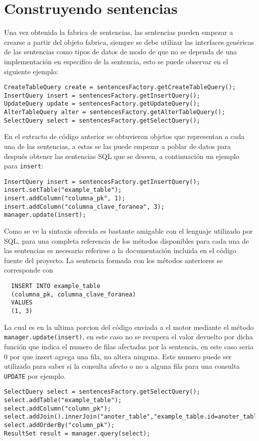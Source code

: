 \section{Construyendo sentencias}
%
%
Una vez obtenida la fabrica de sentencias, las sentencias pueden empezar a crearse a partir del objeto fabrica, siempre se debe utilizar las interfaces genéricas de las sentencias como tipos de datos de modo de que no se dependa de una implementación en especifico de la sentencia, esto se puede observar en el siguiente ejemplo:
%
\begin{lstlisting}[title=Uso de la fabrica de sentencias]
CreateTableQuery create = sentencesFactory.getCreateTableQuery();
InsertQuery insert = sentencesFactory.getInsertQuery();
UpdateQuery update = sentencesFactory.getUpdateQuery();
AlterTableQuery alter = sentencesFactory.getAlterTableQuery();
SelectQuery select = sentencesFactory.getSelectQuery();
\end{lstlisting}
%
En el extracto de código anterior se obtuvieron objetos que representan a cada una de las sentencias, a estas se las puede empezar a poblar de datos para después obtener las sentencias SQL que se deseen, a continuación un ejemplo para \verb=insert=:
%
\begin{lstlisting}[title=Uso de una sentencia INSERT]
InsertQuery insert = sentencesFactory.getInsertQuery();
insert.setTable("example_table");
insert.addColumn("columna_pk", 1);
insert.addColumn("columna_clave_foranea", 3);
manager.update(insert);
\end{lstlisting}
%
Como se ve la sintaxis ofrecida es bastante amigable con el lenguaje utilizado por SQL, para una completa referencia de los métodos disponibles para cada una de las sentencias es necesario referirse a la documentación incluida en el código fuente del proyecto. La sentencia formada con los métodos anteriores se corresponde con
\begin{Verbatim}
  INSERT INTO example_table 
  (columna_pk, columna_clave_foranea) 
  VALUES 
  (1, 3)
\end{Verbatim}
La cual es en la ultima porcion del código enviada a el motor mediante el método \verb=manager.update(insert)=, en este caso no se recupera el valor devuelto por dicha función que indica el numero de filas afectadas por la sentencia, en este caso seria $0$ por que insert agrega una fila, no altera ninguna. Este numero puede ser utilizado para saber si la consulta afecto o no a alguna fila para una consulta \verb=UPDATE= por ejemplo.
%
\begin{lstlisting}[title=Uso de una sentencia SELECT]
SelectQuery select = sentencesFactory.getSelectQuery();
select.addTable("example_table");
select.addColumn("column_pk");
select.addJoin().innerJoin("anoter_table","example_table.id=anoter_table.id");
select.addOrderBy("column_pk");
ResultSet result = manager.query(select); 
\end{lstlisting}

